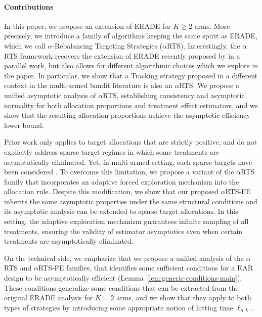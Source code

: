 \paragraph*{Contributions} In this paper, we propose an extension of ERADE for $K\geq 2$ arms. More precisely, we introduce a family of algorithms keeping the same spirit as ERADE, which we call $\alpha$-Rebalancing Targeting Strategies ($\alpha$RTS). %
Interestingly, the $\alpha$RTS framework recovers the extension of ERADE recently proposed by \cite{alkhnefr2025efficient} in a parallel work, but also allows for different algorithmic choices which we explore in the paper. In particular, we show that a Tracking strategy proposed in a different context in the multi-armed bandit literature \citep{garivier2016optimal} is also an $\alpha$RTS. We propose a unified asymptotic analysis of $\alpha$RTS, establishing consistency and asymptotic normality for both allocation proportions and treatment effect estimators, and we show that the resulting allocation proportions achieve the asymptotic efficiency lower bound.

Prior work only applies to target allocations that are strictly positive, and do not explicitly address sparse target regimes in which some treatments are asymptotically eliminated. Yet, in multi-armed setting, such sparse targets have been considered \citep{tymofyeyev2007implementing}. To overcome this limitation, we propose a variant of the $\alpha$RTS family that incorporates an adaptive forced exploration mechanism into the allocation rule. Despite this modification, we show that our proposed $\alpha$RTS-FE inherits the same asymptotic properties  under the same structural conditions and its asymptotic analysis can be extended to sparse target allocations. In this setting, the adaptive exploration mechanism guarantees infinite sampling of all treatments, ensuring the validity of estimator asymptotics even when certain treatments are asymptotically eliminated.

On the technical side, we emphasize that we propose a unified analysis of the $\alpha$RTS and $\alpha$RTS-FE families, that identifies some sufficient conditions for a RAR design to be asymptotically efficient (Lemma~\ref{lem:generic-conditions-main}). These conditions generalize some conditions that can be  extracted from the original ERADE analysis for $K=2$ arms, and we show that they apply to both types of strategies by introducing some appropriate notion of hitting time $\ell_{n,k}$.

